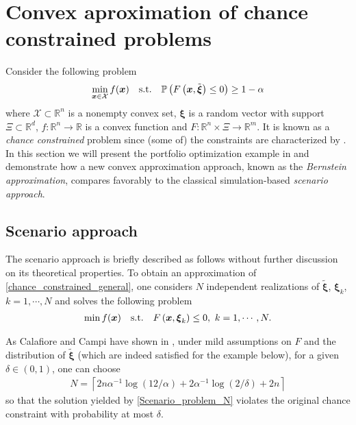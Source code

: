 \documentclass[10pt]{article}
\theoremstyle{definition}
\theoremstyle{plain}
\begin{document}
\section{Convex aproximation of chance constrained problems}
Consider the following problem
\begin{align}\label{chance_constrained_general}
\min_{\boldsymbol{x}\in \mathcal{X}} f(\boldsymbol{x}) \quad \textnormal{s.t.}\quad  \mathbb{P}\left(F\left(\boldsymbol{x},\tilde{\boldsymbol{\xi}}\right)\leq 0\right)\geq 1-\alpha
\end{align}
where $\mathcal{X}\subset \mathbb{R}^n$ is a nonempty convex set, $\boldsymbol{\xi}$ is a random vector with support $\Xi\subset \mathbb{R}^d$, $f: \mathbb{R}^n \rightarrow \mathbb{R}$ is a convex function and $F: \mathbb{R}^n\times \Xi \rightarrow \mathbb{R}^m$. It is known as a \textit{chance constrained} problem since (some of) the constraints are characterized by . In this section we will present the portfolio optimization example in \cite{Nemirovsky_and_Shapiro} and demonstrate how a new convex approximation approach, known as the \textit{Bernstein approximation}, compares favorably to the classical simulation-based \textit{scenario approach}.

\subsection{Scenario approach}
The scenario approach is briefly described as follows without further discussion on its theoretical properties. To obtain an approximation of \eqref{chance_constrained_general}, one considers $N$ independent realizations of $\tilde{\boldsymbol{\xi}}$, $\boldsymbol{\xi}_k$, $k=1,\cdots,N$ and solves the following problem
\begin{align}\label{Scenario_problem_N}
\min f(\boldsymbol{x}) \quad \textnormal{s.t.} \quad F\left(\boldsymbol{x}, \boldsymbol{\xi}_k\right) \leq 0,\ k=1,\cdots,N.
\end{align}

As Calafiore and Campi have shown in \cite{Calafiore_and_Campi}, under mild assumptions on $F$ and the distribution of $\tilde{\boldsymbol{\xi}}$ (which are indeed satisfied for the example below), for a given $\delta\in (0,1)$, one can choose
\begin{align}\label{Choose_N_sample_size}
N = \left\lceil 2n\alpha^{-1}\log(12/\alpha)+2\alpha^{-1}\log(2/\delta)+2n\right\rceil
\end{align}
so that the solution yielded by \eqref{Scenario_problem_N} violates the original chance constraint with probability at most $\delta$.
\end{document}

